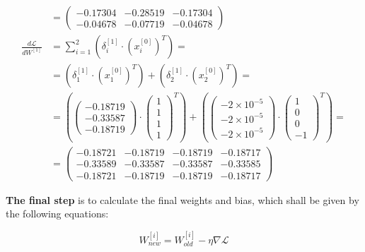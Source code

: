 \documentclass[12pt]{article}
\begin{document}
\begin{enumerate}[leftmargin=\labelsep]
\begin{align*}
             &= \begin{pmatrix} -0.17304 & -0.28519 & -0.17304\\ -0.04678 & -0.07719 & -0.04678 \end{pmatrix} \\
            \frac{d\mathcal{L}}{dW^{[1]}} &= \sum_{i=1}^{2} \left(\delta^{[1]}_i \cdot \left(x^{[0]}_i\right)^{T}\right) = \\
             &= \left(\delta^{[1]}_1 \cdot \left(x^{[0]}_1\right)^{T}\right) + \left(\delta^{[1]}_2 \cdot \left(x^{[0]}_2\right)^{T}\right) = \\
             &= \left(\begin{pmatrix} -0.18719 \\ -0.33587 \\ -0.18719 \end{pmatrix} \cdot \begin{pmatrix} 1 \\ 1 \\ 1 \\ 1\end{pmatrix}^{T}\right) +
                 \left(\begin{pmatrix} -2 \times 10^{-5} \\ -2 \times 10^{-5} \\ -2 \times 10^{-5}  \end{pmatrix} \cdot \begin{pmatrix} 1 \\ 0 \\ 0 \\ -1\end{pmatrix}^{T}\right) = \\
             &= \begin{pmatrix} -0.18721 & -0.18719 & -0.18719 & -0.18717\\ -0.33589 & -0.33587 & -0.33587 & -0.33585 \\ -0.18721 & -0.18719 & -0.18719 & -0.18717\end{pmatrix}
          \end{align*}
        \endgroup

          \textbf{The final step} is to calculate the final weights and bias, which shall be given by the following equations:

          \begin{equation}\label{ex2-new-weight}
            W^{[i]}_{new} = W^{[i]}_{old} - \eta \nabla\mathcal{L}
          \end{equation}


\end{enumerate}
\end{document}
